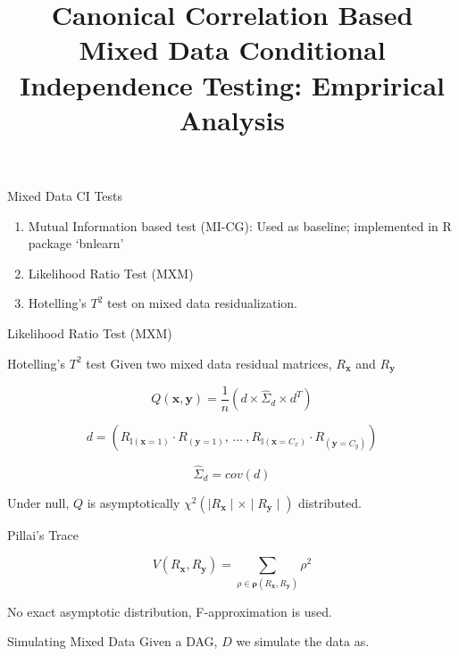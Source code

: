 \documentclass{beamer}
\begin{document}
\title[]{Canonical Correlation Based Mixed Data Conditional Independence Testing: Emprirical Analysis}
\author{}
\date{}

\maketitle

\begin{frame}{Mixed Data CI Tests}
	\begin{enumerate}
		\item Mutual Information based test (MI-CG): Used as baseline; implemented in R package `bnlearn'
		\item Likelihood Ratio Test (MXM)
		\item Hotelling's $T^2$ test on mixed data residualization.
	\end{enumerate}
\end{frame}

\begin{frame}{Likelihood Ratio Test (MXM)}
\end{frame}

\begin{frame}{Hotelling's $ T^2 $ test}
Given two mixed data residual matrices, $ R_\mathbf{x} $ and $ R_\mathbf{y} $

$$ Q(\mathbf{x}, \mathbf{y}) = \frac{1}{n} \left( d \times \hat{\Sigma}_d \times d^T \right) $$


$$
d = (R_{\mathbb{I}(\mathbf{x}=1)} \cdot R_{(\mathbf{y}=1)}, \, \ldots \ ,
R_{\mathbb{I}(\mathbf{x}=C_x)} \cdot R_{(\mathbf{y}=C_y)} )
$$

$$ \hat{\Sigma}_d = cov(d) $$

Under null, $ Q $ is asymptotically $ \chi^2 (\mid R_\mathbf{x} \mid \times \mid R_\mathbf{y} \mid) $ distributed.

\end{frame}

\begin{frame}{Pillai's Trace}

$$ \textit{V}(R_\mathbf{x}, R_\mathbf{y}) = \sum_{\rho \in \bm{\rho}(R_\mathbf{x}, R_\mathbf{y})} \rho^2 $$

No exact asymptotic distribution, F-approximation is used.

\end{frame}

\begin{frame}{Simulating Mixed Data}
	Given a DAG, $ D $ we simulate the data as.
\end{frame}
\end{document}
